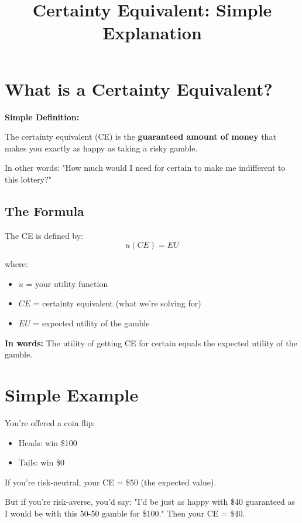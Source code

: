 \documentclass[12pt]{article}
\title{\textbf{Certainty Equivalent: Simple Explanation}}
\author{}
\date{}
\begin{document}
\maketitle

\section*{What is a Certainty Equivalent?}

\begin{tcolorbox}[colback=blue!5!white,colframe=blue!75!black]
\textbf{Simple Definition:}

The certainty equivalent (CE) is the \textbf{guaranteed amount of money} that makes you exactly as happy as taking a risky gamble.

\vspace{0.3cm}

In other words: "How much would I need for certain to make me indifferent to this lottery?"
\end{tcolorbox}

\subsection*{The Formula}

The CE is defined by:
\[
u(CE) = EU
\]

where:
\begin{itemize}
\item $u$ = your utility function
\item $CE$ = certainty equivalent (what we're solving for)
\item $EU$ = expected utility of the gamble
\end{itemize}

\textbf{In words:} The utility of getting CE for certain equals the expected utility of the gamble.

\section*{Simple Example}

You're offered a coin flip:
\begin{itemize}
\item Heads: win \$100
\item Tails: win \$0
\end{itemize}

If you're risk-neutral, your CE = \$50 (the expected value).

But if you're risk-averse, you'd say: "I'd be just as happy with \$40 guaranteed as I would be with this 50-50 gamble for \$100." Then your CE = \$40.
\end{document}

